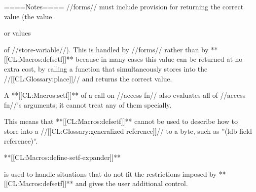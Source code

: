 ====Notes====
//forms// must include provision for returning the correct value (the value

or values

of //store-variable//). This is handled by //forms// rather than by **[[CL:Macros:defsetf]]** because in many cases this value can be returned at no extra cost, by calling a function that simultaneously stores into the //[[CL:Glossary:place]]// and returns the correct value.

A **[[CL:Macros:setf]]** of a call on //access-fn// also evaluates all of //access-fn//'s arguments; it cannot treat any of them specially.

This means that **[[CL:Macros:defsetf]]** cannot be used to describe how to store into a //[[CL:Glossary:generalized reference]]// to a byte, such as ''(ldb field reference)''.

**[[CL:Macros:define-setf-expander]]**

is used to handle situations that do not fit the restrictions imposed by **[[CL:Macros:defsetf]]** and gives the user additional control.

        
